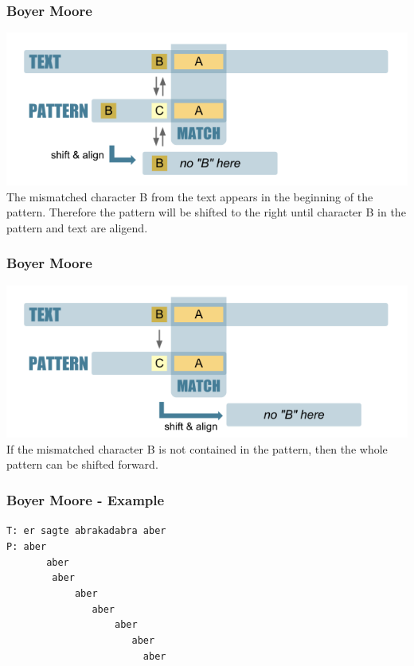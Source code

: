 \begin{frame}[fragile]
  \frametitle{Boyer Moore}
  \includegraphics[scale=0.4]{img/bm1.png}\\
  \vspace{1mm}
  The mismatched character B from the text appears in the beginning of the pattern.
  Therefore the pattern will be shifted to the right until character B in the
  pattern and text are aligend.
\end{frame}

\begin{frame}[fragile]
  \frametitle{Boyer Moore}
  \includegraphics[scale=0.4]{img/bm2.png}\\
  \vspace{1mm}
  If the mismatched character B is not contained in the pattern, then the whole
  pattern can be shifted forward.
\end{frame}

\begin{frame}[fragile] 
\frametitle{Boyer Moore - Example}
\verb|T: er sagte abrakadabra aber|\\
\verb|P: aber|\\
\verb|       aber|\\
\verb|        aber|\\
\verb|            aber|\\
\verb|               aber|\\
\verb|                   aber|\\
\verb|                      aber|\\
\verb|                        aber|
\end{frame}

